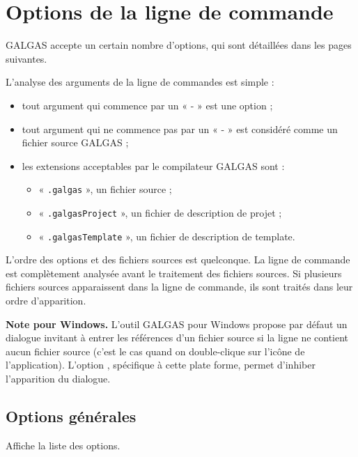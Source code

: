 
\chapter{Options de la ligne de commande}

GALGAS accepte un certain nombre d’options, qui sont détaillées dans les pages suivantes.

L’analyse des arguments de la ligne de commandes est simple :
\begin{itemize}
  \item tout argument qui commence par un « - » est une option ;
  \item tout argument qui ne commence pas par un « - » est considéré comme un fichier source GALGAS ;
  \item les extensions acceptables par le compilateur GALGAS sont :
  \begin{itemize}
    \item « \texttt{.galgas} », un fichier source ;
    \item « \texttt{.galgasProject} », un fichier de description de projet ;
    \item « \texttt{.galgasTemplate} », un fichier de description de template.
  \end{itemize}
\end{itemize}

L’ordre des options et des fichiers sources est quelconque. La ligne de commande est complètement analysée avant le traitement des fichiers sources. Si plusieurs fichiers sources apparaissent dans la ligne de commande, ils sont traités dans leur ordre d’apparition.

{\bf Note pour Windows.} L’outil GALGAS pour Windows propose par défaut un dialogue invitant à entrer les références d’un fichier source si la ligne ne contient aucun fichier source (c’est le cas quand on double-clique sur l’icône de l’application). L'option , spécifique à cette plate forme, permet d'inhiber l’apparition du dialogue.

\section{Options générales}

 Affiche la liste des options.

